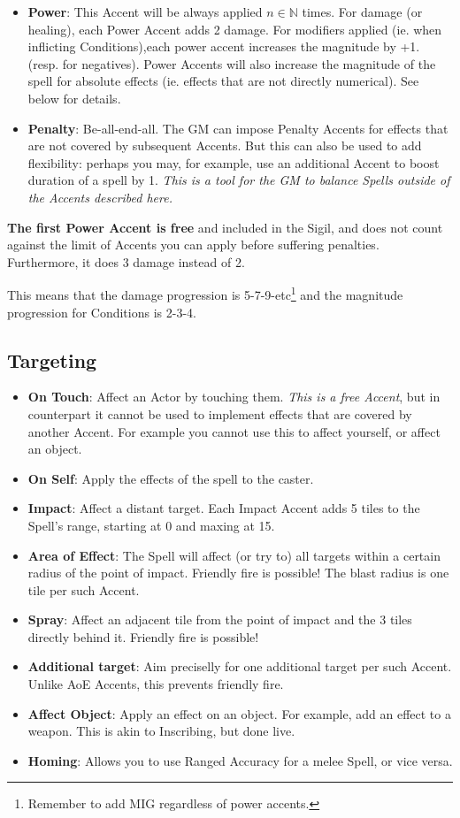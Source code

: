 \begin{itemize}
    \item \textbf{Power}: This Accent will be always applied $n \in \mathds{N}$ times. For damage (or healing), each Power Accent adds 2 damage. For modifiers applied (ie. when inflicting Conditions),each power accent increases the magnitude by +1. (resp. for negatives). Power Accents will also increase the magnitude of the spell for absolute effects (ie. effects that are not directly numerical). See below for details.
    \item \textbf{Penalty}: Be-all-end-all. The GM can impose Penalty Accents for effects that are not covered by subsequent Accents. But this can also be used to add flexibility: perhaps you may, for example, use an additional Accent to boost duration of a spell by 1. \textit{This is a tool for the GM to balance Spells outside of the Accents described here.}
\end{itemize}

\textbf{The first Power Accent is free} and included in the Sigil, and does not count against the limit of Accents you can apply before suffering penalties. Furthermore, it does 3 damage instead of 2.

This means that the damage progression is 5-7-9-etc\footnote{Remember to add MIG regardless of power accents.} and the magnitude progression for Conditions is 2-3-4.


\subsection{Targeting}

\begin{itemize}
    \item \textbf{On Touch}: Affect an Actor by touching them. \textit{This is a free Accent}, but in counterpart it cannot be used to implement effects that are covered by another Accent. For example you cannot use this to affect yourself, or affect an object.
    \item \textbf{On Self}: Apply the effects of the spell to the caster.
    \item \textbf{Impact}: Affect a distant target. Each Impact Accent adds 5 tiles to the Spell's range, starting at 0 and maxing at 15. 
    \item \textbf{Area of Effect}: The Spell will affect (or try to) all targets within a certain radius of the point of impact. Friendly fire is possible! The blast radius is one tile per such Accent.
    \item \textbf{Spray}: Affect an adjacent tile from the point of impact and the 3 tiles directly behind it. Friendly fire is possible!
    \item \textbf{Additional target}: Aim preciselly for one additional target per such Accent. Unlike AoE Accents, this prevents friendly fire.
    \item \textbf{Affect Object}: Apply an effect on an object. For example, add an effect to a weapon. This is akin to Inscribing, but done live.
    \item \textbf{Homing}: Allows you to use Ranged Accuracy for a melee Spell, or vice versa.
\end{itemize}

